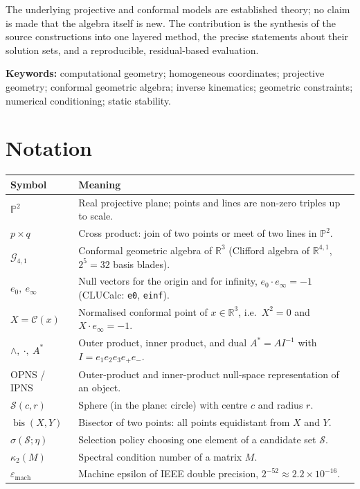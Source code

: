 \documentclass[11pt,a4paper]{article}
\theoremstyle{plain}
\theoremstyle{definition}
\theoremstyle{remark}
\newcommand{\R}{\mathbb{R}}
\newcommand{\PP}{\mathbb{P}}
\newcommand{\GA}{\mathcal{G}_{4,1}}
\newcommand{\einf}{e_{\infty}}
\newcommand{\ezero}{e_{0}}
\newcommand{\bis}{\operatorname{bis}}
\newcommand{\Sph}{\mathcal{S}}
\begin{document}
The underlying projective and conformal models are established theory; no
claim is made that the algebra itself is new. The contribution is the
synthesis of the source constructions into one layered method, the precise
statements about their solution sets, and a reproducible, residual-based
evaluation.

\vspace{0.6em}
\textbf{Keywords:} computational geometry; homogeneous coordinates; projective
geometry; conformal geometric algebra; inverse kinematics; geometric
constraints; numerical conditioning; static stability.

\clearpage
\tableofcontents

\clearpage
\section*{Notation}

\begin{tabularx}{\textwidth}{@{}p{30mm}Y@{}}
  \toprule
  Symbol & Meaning \\
  \midrule
  $\PP^2$ & Real projective plane; points and lines are non-zero triples up to scale. \\
  $p\times q$ & Cross product: join of two points or meet of two lines in $\PP^2$. \\
  $\GA$ & Conformal geometric algebra of $\R^3$ (Clifford algebra of $\R^{4,1}$, $2^5=32$ basis blades). \\
  $\ezero,\ \einf$ & Null vectors for the origin and for infinity, $\ezero\cdot\einf=-1$ (CLUCalc: \texttt{e0}, \texttt{einf}). \\
  $X=\mathcal C(x)$ & Normalised conformal point of $x\in\R^3$, i.e.\ $X^2=0$ and $X\cdot\einf=-1$. \\
  $\wedge,\ \cdot,\ A^{*}$ & Outer product, inner product, and dual $A^{*}=AI^{-1}$ with $I=e_1e_2e_3e_{+}e_{-}$. \\
  OPNS / IPNS & Outer-product and inner-product null-space representation of an object. \\
  $\Sph(c,r)$ & Sphere (in the plane: circle) with centre $c$ and radius $r$. \\
  $\bis(X,Y)$ & Bisector of two points: all points equidistant from $X$ and $Y$. \\
  $\sigma(\mathcal S;\eta)$ & Selection policy choosing one element of a candidate set $\mathcal S$. \\
  $\kappa_2(M)$ & Spectral condition number of a matrix $M$. \\
  $\varepsilon_{\mathrm{mach}}$ & Machine epsilon of IEEE double precision, $2^{-52}\approx2.2\times10^{-16}$. \\
  \bottomrule
\end{tabularx}
\end{document}
